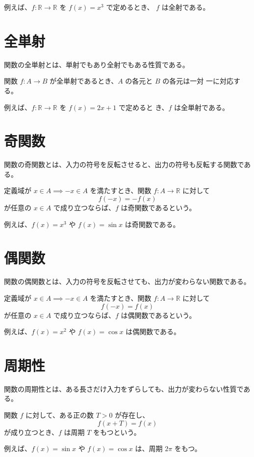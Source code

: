 \documentclass[11pt]{ltjsreport}
\begin{document}
例えば、\( f : \mathbb{R} \to \mathbb{R} \) を \( f(x) = x^3 \) で定めるとき、
\( f \) は全射である。

\section{全単射}

関数の全単射とは、単射でもあり全射でもある性質である。

関数 \( f : A \to B \) が全単射であるとき、\( A \) の各元と \( B \) の各元は一対
一に対応する。

例えば、\( f : \mathbb{R} \to \mathbb{R} \) を \( f(x) = 2x + 1 \) で定めると
き、\( f \) は全単射である。

\section{奇関数}

関数の奇関数とは、入力の符号を反転させると、出力の符号も反転する関数である。

定義域が \( x \in A \implies -x \in A \) を満たすとき、関数
\( f : A \to \mathbb{R} \) に対して
\[
   f(-x) = -f(x)
\]
が任意の \( x \in A \) で成り立つならば、\( f \) は奇関数であるという。

例えば、\( f(x) = x^3 \) や \( f(x) = \sin x \) は奇関数である。

\section{偶関数}

関数の偶関数とは、入力の符号を反転させても、出力が変わらない関数である。

定義域が \( x \in A \implies -x \in A \) を満たすとき、関数
\( f : A \to \mathbb{R} \) に対して
\[
   f(-x) = f(x)
\]
が任意の \( x \in A \) で成り立つならば、\( f \) は偶関数であるという。

例えば、\( f(x) = x^2 \) や \( f(x) = \cos x \) は偶関数である。

\section{周期性}

関数の周期性とは、ある長さだけ入力をずらしても、出力が変わらない性質である。

関数 \( f \) に対して、ある正の数 \( T > 0 \) が存在し、
\[
   f(x + T) = f(x)
\]
が成り立つとき、\( f \) は周期 \( T \) をもつという。

例えば、\( f(x) = \sin x \) や \( f(x) = \cos x \) は、周期 \( 2\pi \) をもつ。
\end{document}
